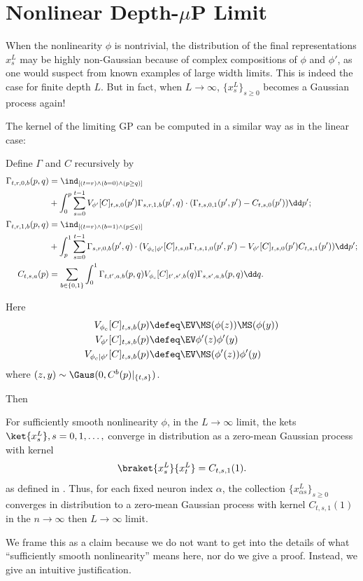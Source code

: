 
\section{Nonlinear Depth-$\mu$P Limit}

When the nonlinearity $\phi$ is nontrivial, the distribution of the final representations $x^L_s$ may be highly non-Gaussian because of complex compositions of $\phi$ and $\phi'$, as one would suspect from known examples of large width limits.
This is indeed the case for finite depth $L$. But in fact, when $L \to \infty$, $\{x^L_s\}_{s\ge 0}$ becomes a Gaussian process again!

The kernel of the limiting GP can be computed in a similar way as in the linear case:
\begin{definition}\label{defn:nonlinearGammaC}
    Define $\Gamma$ and $C$ recursively by
    \begin{align*}
        \Gamma_{t,r,0,b}(p, q)&=\ind_{[(t=r) \wedge (b=0) \wedge (p\geq q)]} \\ 
        &+ \int_0^p \sum_{s=0}^{t-1} V_{\phi'}[C]_{t,s,0}(p')\Gamma_{s,r,1,b}(p',q)\cdot (\Gamma_{t,s,0,1}(p', p') - C_{t,s,0}(p'))\dd p'; \\
           \Gamma_{t,r,1,b}(p, q) &= \ind_{[(t=r) \wedge (b=1) \wedge (p\leq q)]} \\
           &+ \int_p^1 \sum_{s=0}^{t-1} \Gamma_{s,r,0,b}(p',q) \cdot (V_{\phi_c|\phi'}[C]_{t,s,0}\Gamma_{t,s,1,0}(p',p') - V_{\phi'}[C]_{t,s,0}(p') C_{t,s,1}(p'))\dd p';\\
           C_{t,s,a}(p)&=
           \sum_{b\in\{0,1\}}\int_0^1 \Gamma_{t,t',a,b}(p,q) V_{\phi_c} [C]_{t',s',b}(q)\Gamma_{s,s',a,b}(p,q) \dd q.
    \end{align*}
\end{definition}

Here
\begin{align*}
    V_{\phi_c}[C]_{t,s,b}(p) &\defeq \EV \MS(\phi(z)) \MS(\phi(y)) \\ 
    V_{\phi'}[C]_{t,s,b}(p) &\defeq \EV \phi'(z) \phi'(y) \\
    V_{\phi_c | \phi'}[C]_{t,s,b}(p) &\defeq \EV \MS(\phi'(z)) \phi'(y) \\
\end{align*}
where $(z, y) \sim \Gaus(0, C^b(p)|_{\{t,s\}})$.

Then 
\begin{claim}\label{claim:nonlineardepthmuplimit}
    For sufficiently smooth nonlinearity $\phi$, in the $L \to \infty$ limit, the kets $\ket{x^L_s}, s = 0, 1, \ldots,$ converge in distribution as a zero-mean Gaussian process with kernel
    \[\braket{x^L_s}{x^L_t} = C_{t,s,1}(1).\]
    as defined in .
    Thus, for each fixed neuron index $\alpha$, the collection $\{x^L_{\alpha s}\}_{s\ge 0}$ converges in distribution to a zero-mean Gaussian process with kernel $C_{t,s,1}(1)$ in the $n\to\infty$ then $L\to\infty$ limit.
\end{claim}
We frame this as a claim because we do not want to get into the details of what ``sufficiently smooth nonlinearity'' means here, nor do we give a proof. Instead, we give an intuitive justification.

